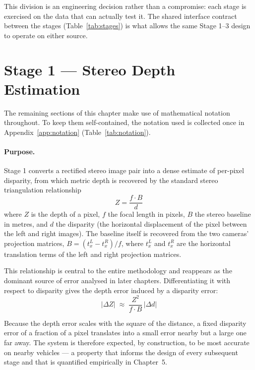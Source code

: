 This division is an engineering decision rather than a compromise: each stage is
exercised on the data that can actually test it. The shared
interface contract between the stages (Table~\ref{tab:stages}) is what allows the
same Stage 1--3 design to operate on either source.

\section{Stage 1 --- Stereo Depth Estimation}
\label{sec:stage1}

The remaining sections of this chapter make use of mathematical notation throughout. To keep them self-contained, the notation used is collected once in Appendix~\ref{app:notation} (Table~\ref{tab:notation}).

\paragraph{Purpose.} Stage 1 converts a rectified stereo image pair into a dense
estimate of per-pixel disparity, from which metric depth is recovered by the
standard stereo triangulation relationship~\cite{szeliski2022computer}
\begin{equation}
Z = \frac{f \cdot B}{d}
\label{eq:triangulation}
\end{equation}
where $Z$ is the depth of a pixel, $f$ the focal length in pixels, $B$ the stereo
baseline in metres, and $d$ the disparity (the horizontal displacement of the pixel
between the left and right images). The baseline itself is recovered from the two
cameras' projection matrices, $B = (t_x^{L} - t_x^{R}) / f$, where $t_x^{L}$ and
$t_x^{R}$ are the horizontal translation terms of the left and right projection
matrices.

This relationship is central to the entire methodology and reappears as the
dominant source of error analysed in later chapters. Differentiating it with
respect to disparity gives the depth error induced by a disparity error:
\begin{equation}
\left| \Delta Z \right| \;\approx\; \frac{Z^{2}}{f \cdot B}\, \left| \Delta d \right|
\label{eq:deptherror}
\end{equation}

Because the depth error scales with the square of the distance, a fixed
disparity error of a fraction of a pixel translates into a small error nearby but a
large one far away. The system is therefore expected, by construction, to be most
accurate on nearby vehicles --- a property that informs the design of every
subsequent stage and that is quantified empirically in Chapter~5.

